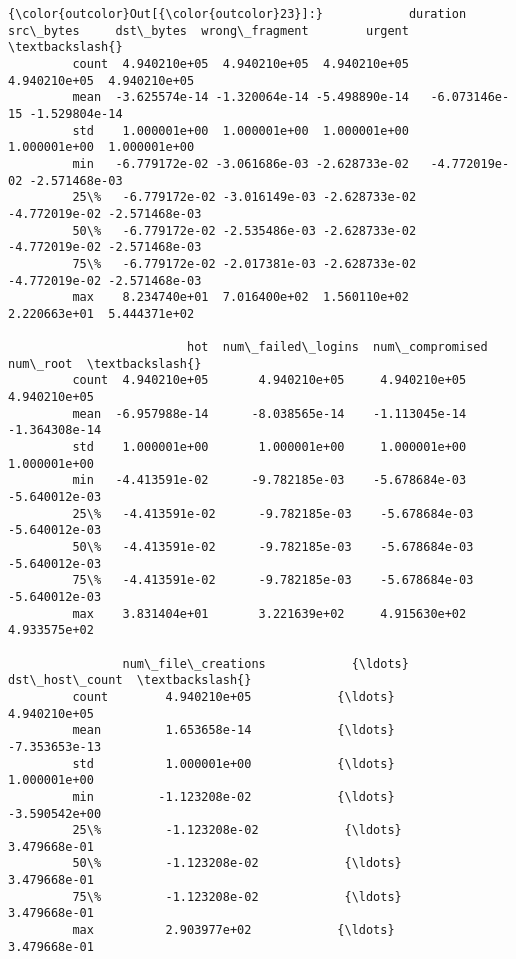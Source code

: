 \documentclass[11pt]{article}
\begin{document}
\begin{Verbatim}[commandchars=\\\{\}]
{\color{outcolor}Out[{\color{outcolor}23}]:}            duration     src\_bytes     dst\_bytes  wrong\_fragment        urgent  \textbackslash{}
         count  4.940210e+05  4.940210e+05  4.940210e+05    4.940210e+05  4.940210e+05   
         mean  -3.625574e-14 -1.320064e-14 -5.498890e-14   -6.073146e-15 -1.529804e-14   
         std    1.000001e+00  1.000001e+00  1.000001e+00    1.000001e+00  1.000001e+00   
         min   -6.779172e-02 -3.061686e-03 -2.628733e-02   -4.772019e-02 -2.571468e-03   
         25\%   -6.779172e-02 -3.016149e-03 -2.628733e-02   -4.772019e-02 -2.571468e-03   
         50\%   -6.779172e-02 -2.535486e-03 -2.628733e-02   -4.772019e-02 -2.571468e-03   
         75\%   -6.779172e-02 -2.017381e-03 -2.628733e-02   -4.772019e-02 -2.571468e-03   
         max    8.234740e+01  7.016400e+02  1.560110e+02    2.220663e+01  5.444371e+02   
         
                         hot  num\_failed\_logins  num\_compromised      num\_root  \textbackslash{}
         count  4.940210e+05       4.940210e+05     4.940210e+05  4.940210e+05   
         mean  -6.957988e-14      -8.038565e-14    -1.113045e-14 -1.364308e-14   
         std    1.000001e+00       1.000001e+00     1.000001e+00  1.000001e+00   
         min   -4.413591e-02      -9.782185e-03    -5.678684e-03 -5.640012e-03   
         25\%   -4.413591e-02      -9.782185e-03    -5.678684e-03 -5.640012e-03   
         50\%   -4.413591e-02      -9.782185e-03    -5.678684e-03 -5.640012e-03   
         75\%   -4.413591e-02      -9.782185e-03    -5.678684e-03 -5.640012e-03   
         max    3.831404e+01       3.221639e+02     4.915630e+02  4.933575e+02   
         
                num\_file\_creations            {\ldots}             dst\_host\_count  \textbackslash{}
         count        4.940210e+05            {\ldots}               4.940210e+05   
         mean         1.653658e-14            {\ldots}              -7.353653e-13   
         std          1.000001e+00            {\ldots}               1.000001e+00   
         min         -1.123208e-02            {\ldots}              -3.590542e+00   
         25\%         -1.123208e-02            {\ldots}               3.479668e-01   
         50\%         -1.123208e-02            {\ldots}               3.479668e-01   
         75\%         -1.123208e-02            {\ldots}               3.479668e-01   
         max          2.903977e+02            {\ldots}               3.479668e-01   
         

\end{Verbatim}
\end{document}
